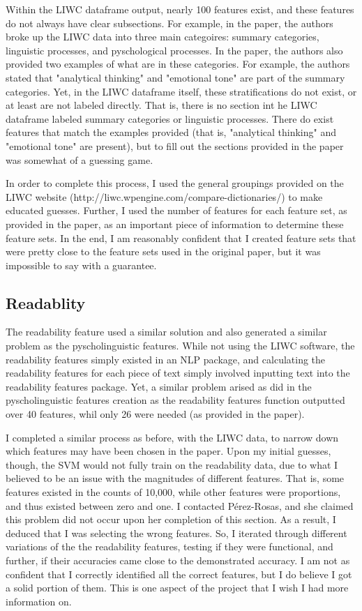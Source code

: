 \documentclass{article}
\begin{document}
Within the LIWC dataframe output, nearly 100 features exist, and these features do not always have clear subsections. For example, in the paper, the authors broke up the LIWC data into three main categoires: summary categories, linguistic processes, and pyschological processes. In the paper, the authors also provided two examples of what are in these categories. For example, the authors stated that "analytical thinking" and "emotional tone" are part of the summary categories. Yet, in the LIWC dataframe itself, these stratifications do not exist, or at least are not labeled directly. That is, there is no section int he LIWC dataframe labeled summary categories or linguistic processes. There do exist features that match the examples provided (that is, "analytical thinking" and "emotional tone" are present), but to fill out the sections provided in the paper was somewhat of a guessing game.

In order to complete this process, I used the general groupings provided on the LIWC website (http://liwc.wpengine.com/compare-dictionaries/) to make educated guesses. Further, I used the number of features for each feature set, as provided in the paper, as an important piece of information to determine these feature sets. In the end, I am reasonably confident that I created feature sets that were pretty close to the feature sets used in the original paper, but it was impossible to say with a guarantee.

\subsection{Readablity}

The readability feature used a similar solution and also generated a similar problem as the pyscholinguistic features. While not using the LIWC software, the readability features simply existed in an NLP package, and calculating the readability features for each piece of text simply involved inputting text into the readability features package. Yet, a similar problem arised as did in the pyscholinguistic features creation as the readability features function outputted over 40 features, whil only 26 were needed (as provided in the paper). 

I completed a similar process as before, with the LIWC data, to narrow down which features may have been chosen in the paper. Upon my initial guesses, though, the SVM would not fully train on the readability data, due to what I believed to be an issue with the magnitudes of different features. That is, some features existed in the counts of 10,000, while other features were proportions, and thus existed between zero and one. I contacted P\'erez-Rosas, and she claimed this problem did not occur upon her completion of this section. As a result, I deduced that I was selecting the wrong features. So, I iterated through different variations of the the readability features, testing if they were functional, and further, if their accuracies came close to the demonstrated accuracy. I am not as confident that I correctly identified all the correct features, but I do believe I got a solid portion of them. This is one aspect of the project that I wish I had more information on.
\end{document}
